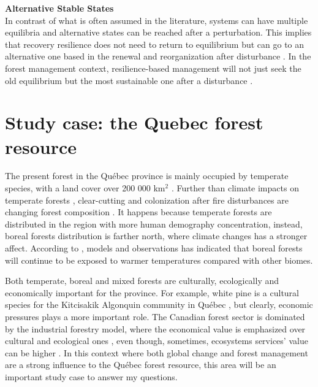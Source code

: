 \textbf{Alternative Stable States} \\
In contrast of what is often assumed in the literature, systems can have multiple equilibria and alternative states can be reached after a perturbation.
This implies that recovery resilience does not need to return to equilibrium but can go to an alternative one based in the renewal and reorganization after disturbance \parencite{Mori2016a}.
In the forest management context, resilience-based management will not just seek the old equilibrium but the most sustainable one after a disturbance \parencite{ChapinIII2009}.


\section{Study case: the Quebec forest resource}

The present forest in the Québec province is mainly occupied by temperate species, with a land cover over 200 000 km$^2$ \parencite{Boulay2015}.
Further than climate impacts on temperate forests \parencite{McKenney2011}, clear-cutting and colonization after fire disturbances are changing forest composition \parencite{Dupuis2011}.
It happens because temperate forests are distributed in the region with more human demography concentration, instead, boreal forests distribution is farther north, where climate changes has a stronger affect.
According to \textcite{Price2013}, models and observations has indicated that boreal forests will continue to be exposed to warmer temperatures compared with other biomes.

Both temperate, boreal and mixed forests are culturally, ecologically and economically important for the province.
For example, white pine is a cultural species for the Kitcisakik Algonquin community in Québec \parencite{Uprety2013}, but clearly, economic pressures plays a more important role.
The Canadian forest sector is dominated by the industrial forestry model, where the economical value is emphasized over cultural and ecological ones \parencite{Howlett2001}, even though, sometimes, ecosystems services' value can be higher \parencite{Costanza1997}.
In this context where both global change and forest management are a strong influence to the Québec forest resource, this area will be an important study case to answer my questions.

